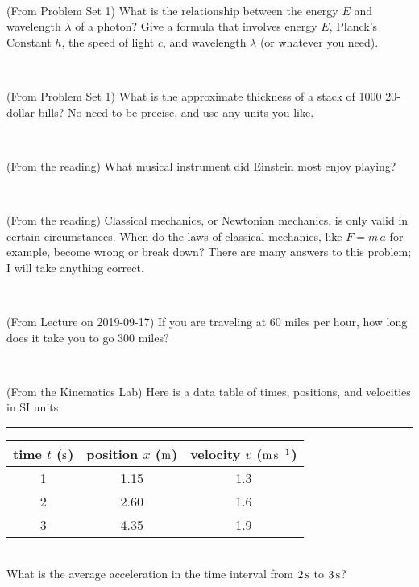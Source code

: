 \documentclass[12pt, letterpaper]{article}
\begin{document}
\vfill ~

\begin{problem} (From Problem Set 1)
What is the relationship between the energy $E$ and wavelength
$\lambda$ of a photon? Give a formula that involves energy $E$,
Planck's Constant $h$, the speed of light $c$, and wavelength
$\lambda$ (or whatever you need).
\end{problem}

\vfill ~

\begin{problem} (From Problem Set 1)
What is the approximate thickness of a stack of 1000 20-dollar bills?
No need to be precise, and use any units you like.
\end{problem}


\vfill ~


\clearpage


\begin{problem} (From the reading)
What musical instrument did Einstein most enjoy playing?
\end{problem}


\vfill ~

\begin{problem} (From the reading)
Classical mechanics, or Newtonian mechanics, is only valid in certain
circumstances. When do the laws of classical mechanics, like $F =
m\,a$ for example, become wrong or break down? There are many answers
to this problem; I will take anything correct.
\end{problem}


\vfill ~

\begin{problem} (From Lecture on 2019-09-17)
If you are traveling at 60 miles per hour, how long does
it take you to go 300 miles?
\end{problem}


\vfill ~

\begin{problem} (From the Kinematics Lab)
Here is a data table of times, positions, and velocities in SI units:\\
\rule{1.0in}{0pt}\begin{tabular}{c|c|c}
time $t$ ($\mathrm{s}$) & position $x$ ($\mathrm{m}$) & velocity $v$ ($\mathrm{m}\,\mathrm{s}^{-1}$) \\
\hline
1 & 1.15 & 1.3 \\
2 & 2.60 & 1.6 \\
3 & 4.35 & 1.9 \\
\hline
\end{tabular}\\
What is the average acceleration in the time interval from $2\,\mathrm{s}$ to $3\,\mathrm{s}$?
\end{problem}
\end{document}
